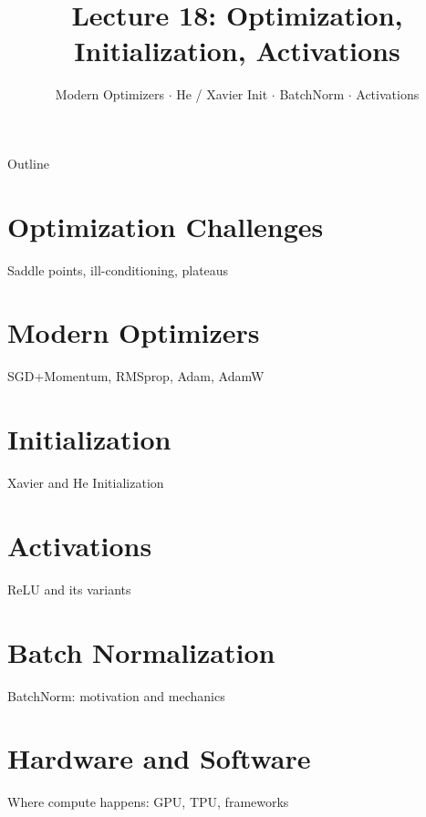 \documentclass[aspectratio=169]{beamer}
\title{Lecture 18: Optimization, Initialization, Activations}
\subtitle{Modern Optimizers $\cdot$ He / Xavier Init $\cdot$ BatchNorm $\cdot$ Activations}
\date{}
\begin{document}
\begin{frame}\titlepage\end{frame}

\begin{frame}{Outline}
  \tableofcontents
\end{frame}

\section{Optimization Challenges}
\begin{frame}{Saddle points, ill-conditioning, plateaus}
\end{frame}

\section{Modern Optimizers}
\begin{frame}{SGD+Momentum, RMSprop, Adam, AdamW}
\end{frame}

\section{Initialization}
\begin{frame}{Xavier and He Initialization}
\end{frame}

\section{Activations}
\begin{frame}{ReLU and its variants}
\end{frame}

\section{Batch Normalization}
\begin{frame}{BatchNorm: motivation and mechanics}
\end{frame}

\section{Hardware and Software}
\begin{frame}{Where compute happens: GPU, TPU, frameworks}
\end{frame}
\end{document}
